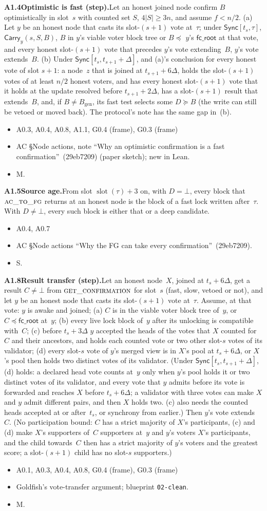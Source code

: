 \documentclass{article}
\newcommand{\genesis}{B_{\mathrm{gen}}}
\newcommand{\slot}{\operatorname{slot}}
\newcommand{\fcroot}{\mathsf{fc\_root}}
\newcommand{\fname}[1]{\text{\textsc{#1}}}
\newcommand{\dagnode}[6]{%
\par\medskip\noindent\textbf{#1\enspace #2.}\enspace #3
\begin{itemize}[leftmargin=2.2em,itemsep=0pt,topsep=2pt]
\item[\emph{Uses}] #4
\item[\emph{Evid.}] #5
\item[\emph{Task}] #6
\end{itemize}}
\begin{document}
\dagnode{A1.4}{Optimistic is fast (step)}{Let an honest joined node confirm $B$
optimistically in slot~$s$ with counted set $S$, $4|S|\geq3n$, and assume
$f<n/2$.  (a) Let $y$ be an honest node that casts its slot-$(s+1)$ vote
at~$\tau$; under $\mathsf{Sync}[t_s,\tau]$, $\mathsf{Carry}_y(s,S,B)$, $B$ in
$y$'s viable voter block tree or $B\preceq$ $y$'s $\fcroot$ at that vote, and
every honest slot-$(s+1)$ vote that precedes $y$'s vote extending~$B$, $y$'s
vote extends~$B$.  (b) Under $\mathsf{Sync}[t_s,t_{s+1}+\Delta]$, and (a)'s
conclusion for every honest vote of slot $s+1$: a node~$z$ that is joined
at $t_{s+1}+6\Delta$, holds the slot-$(s+1)$ votes of at least $n/2$ honest
voters, and has every honest slot-$(s+1)$ vote that it holds at the update
resolved before $t_{s+1}+2\Delta$, has a slot-$(s+1)$ result that extends~$B$,
and, if $B\neq\genesis$, its fast test selects some $D\succeq B$ (the write can
still be vetoed or moved back).  The protocol's note has the same gap in~(b).}
{A0.3, A0.4, A0.8, A1.1, G0.4 (frame), G0.3 (frame)}{AC \S Node actions, note ``Why an optimistic confirmation
is a fast confirmation''~(29eb7209) (paper sketch); new in Lean.}{M.}

\dagnode{A1.5}{Source age}{From slot $\slot(\tau)+3$ on, with $D=\bot$, every
block that $\fname{ac\_to\_fg}$ returns at an honest node is the block of a fast
lock written after~$\tau$.  With $D\neq\bot$, every such block is either that
or a deep candidate.}
{A0.4, A0.7}{AC \S Node actions ``Why the FG can take every confirmation''~(29eb7209).}{S.}

\dagnode{A1.8}{Result transfer (step)}{Let an honest node~$X$, joined at
$t_s+6\Delta$, get a result $C\neq\bot$ from $\fname{get\_confirmation}$ for
slot~$s$ (fast, slow, vetoed or not), and let $y$ be an honest node that
casts its slot-$(s+1)$ vote at~$\tau$.  Assume, at that vote: $y$ is awake and
joined; (a) $C$ is in the viable voter
block tree of~$y$, or $C\preceq\fcroot$ at~$y$; (b) every live lock block
of~$y$ after its unlocking is compatible with~$C$; (c) before $t_s+3\Delta$
$y$ accepted the heads of the votes that $X$ counted for~$C$ and their
ancestors, and holds each counted vote or two other slot-$s$ votes of its
validator; (d) every slot-$s$ vote of $y$'s merged view is in $X$'s pool at
$t_s+6\Delta$, or $X$'s pool then holds two distinct votes of its validator.
(Under $\mathsf{Sync}[t_s,t_{s+1}+\Delta]$, (d) holds: a declared head vote
counts at~$y$ only when $y$'s pool holds it or two distinct votes of its
validator, and every vote that $y$ admits before its vote is forwarded and reaches
$X$ before $t_s+6\Delta$; a validator with three votes can make $X$ and $y$
admit different pairs, and then $X$ holds two.  (c) also needs the counted heads
accepted at or after~$t_s$, or synchrony from earlier.)  Then $y$'s vote extends~$C$.  (No
participation bound: $C$ has a strict majority of $X$'s participants, (c) and
(d) make $X$'s supporters of~$C$ supporters at~$y$ and $y$'s voters $X$'s
participants, and the child towards~$C$ then has a strict majority of $y$'s
voters and the greatest score; a slot-$(s+1)$ child has no slot-$s$
supporters.)}
{A0.1, A0.3, A0.4, A0.8, G0.4 (frame), G0.3 (frame)}{Goldfish's vote-transfer argument; blueprint
\texttt{02-clean}.}{M.}
\end{document}
